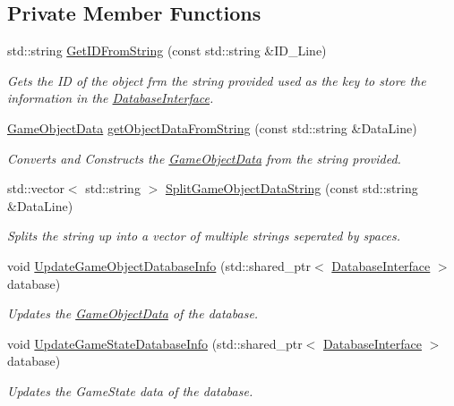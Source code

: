 \subsection*{Private Member Functions}
\begin{DoxyCompactItemize}
\item 
std\+::string \hyperlink{class_data_mapper_a46e3c795a3ec96a58dd1006079b0938d}{Get\+I\+D\+From\+String} (const std\+::string \&I\+D\+\_\+\+Line)
\begin{DoxyCompactList}\small\item\em Gets the ID of the object frm the string provided used as the key to store the information in the \hyperlink{class_database_interface}{Database\+Interface}. \end{DoxyCompactList}\item 
\hyperlink{struct_game_object_data}{Game\+Object\+Data} \hyperlink{class_data_mapper_a69d2e0ba874a2e3b0dd9752c1c72db34}{get\+Object\+Data\+From\+String} (const std\+::string \&Data\+Line)
\begin{DoxyCompactList}\small\item\em Converts and Constructs the \hyperlink{struct_game_object_data}{Game\+Object\+Data} from the string provided. \end{DoxyCompactList}\item 
std\+::vector$<$ std\+::string $>$ \hyperlink{class_data_mapper_a296af9345fd16e4397251efef8726a74}{Split\+Game\+Object\+Data\+String} (const std\+::string \&Data\+Line)
\begin{DoxyCompactList}\small\item\em Splits the string up into a vector of multiple strings seperated by spaces. \end{DoxyCompactList}\item 
void \hyperlink{class_data_mapper_af92f7728727500d39ff4aa1d6ca2b81b}{Update\+Game\+Object\+Database\+Info} (std\+::shared\+\_\+ptr$<$ \hyperlink{class_database_interface}{Database\+Interface} $>$ database)
\begin{DoxyCompactList}\small\item\em Updates the \hyperlink{struct_game_object_data}{Game\+Object\+Data} of the database. \end{DoxyCompactList}\item 
void \hyperlink{class_data_mapper_aefb6246f9bf9fc9974cd52a1b46d165e}{Update\+Game\+State\+Database\+Info} (std\+::shared\+\_\+ptr$<$ \hyperlink{class_database_interface}{Database\+Interface} $>$ database)
\begin{DoxyCompactList}\small\item\em Updates the Game\+State data of the database. \end{DoxyCompactList}\end{DoxyCompactItemize}
